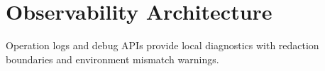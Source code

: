 \section{Observability Architecture}
Operation logs and debug APIs provide local diagnostics with redaction boundaries and environment mismatch warnings.

